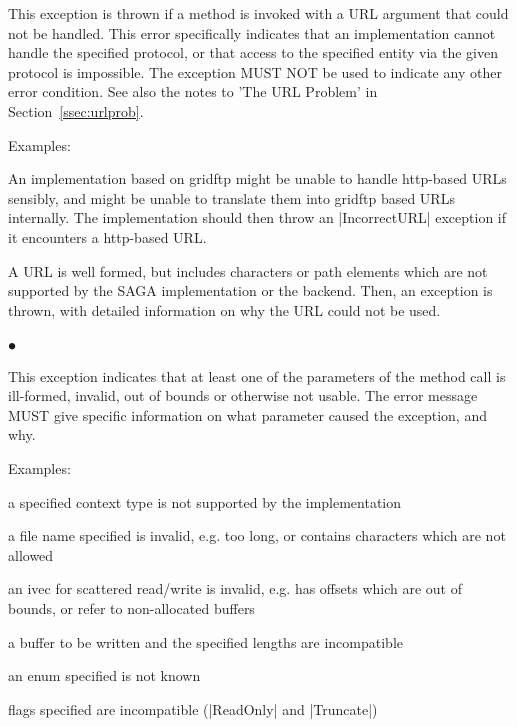    This exception is thrown if a method is invoked with a URL
   argument that could not be handled. This error specifically
   indicates that an implementation cannot handle the specified
   protocol, or that access to the specified entity via the
   given protocol is impossible.  The exception MUST NOT be used
   to indicate any other error condition.  See also the notes to
   'The URL Problem' in Section~\ref{ssec:urlprob}.
 
    Examples:
 
    \begin{shortlist}
     \item An implementation based on gridftp might be unable to
       handle http-based URLs sensibly, and might be unable to
       translate them into gridftp based URLs internally.  
       The implementation should then throw an |IncorrectURL|
       exception if it encounters a http-based URL.
     \item A URL is well formed, but includes
       characters or path elements which are not supported by
       the SAGA implementation or the backend. Then, an
        exception is thrown, with detailed
       information on why the URL could not be used.
    \end{shortlist}
 
 
  \subsubsection*{$\bullet$ }\up
 
    This exception indicates that at least one of the parameters
    of the method call is ill-formed, invalid, out of bounds or
    otherwise not usable.  The error message MUST give specific
    information on what parameter caused the exception, and why.
 
    Examples:
 
    \begin{shortlist}
     \item a specified context type is not supported by the
           implementation
     \item a file name specified is invalid, e.g. too long, or
           contains characters which are not allowed
     \item an ivec for scattered read/write is invalid, e.g. has
           offsets which are out of bounds, or refer to
           non-allocated buffers
     \item a buffer to be written and the specified lengths are
           incompatible
     \item an enum specified is not known
     \item flags specified are incompatible (|ReadOnly| 
           and |Truncate|)
    \end{shortlist}
 
